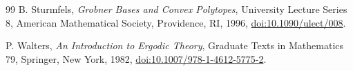 \documentclass[11pt]{article}
\begin{document}
\begin{thebibliography}{99}
B. Sturmfels,
\newblock \emph{Grobner Bases and Convex Polytopes},
\newblock University Lecture Series 8, American Mathematical Society,
Providence, RI, 1996,
\newblock \href{https://doi.org/10.1090/ulect/008}
{doi:10.1090/ulect/008}.

P. Walters,
\newblock \emph{An Introduction to Ergodic Theory},
\newblock Graduate Texts in Mathematics 79, Springer, New York, 1982,
\newblock \href{https://doi.org/10.1007/978-1-4612-5775-2}
{doi:10.1007/978-1-4612-5775-2}.

\end{thebibliography}
\end{document}
